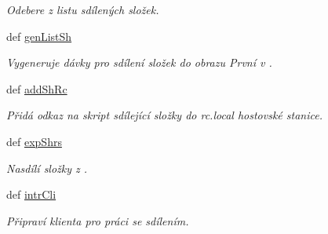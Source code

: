 \begin{DoxyCompactItemize}
\begin{DoxyCompactList}\small\item\em Odebere z listu sdílených složek. \end{DoxyCompactList}\item 
def \hyperlink{classShrFol_1_1ShrFol_a689d7f68c00bb7fb068646bdbbec97b8}{gen\-List\-Sh}
\begin{DoxyCompactList}\small\item\em Vygeneruje dávky pro sdílení složek do obrazu První v . \end{DoxyCompactList}\item 
def \hyperlink{classShrFol_1_1ShrFol_a04f993258bc66b3f4702891962fbfcd2}{add\-Sh\-Rc}
\begin{DoxyCompactList}\small\item\em Přidá odkaz na skript sdílející složky do rc.\-local hostovské stanice. \end{DoxyCompactList}\item 
def \hyperlink{classShrFol_1_1ShrFol_a115dac3a241b1c02fb8076e30d8b0eed}{exp\-Shrs}
\begin{DoxyCompactList}\small\item\em Nasdílí složky z . \end{DoxyCompactList}\item 
def \hyperlink{classShrFol_1_1ShrFol_a1419a3ffeaca3209922efb5179bf6b44}{intr\-Cli}
\begin{DoxyCompactList}\small\item\em Připraví klienta pro práci se sdílením. \end{DoxyCompactList}\end{DoxyCompactItemize}
